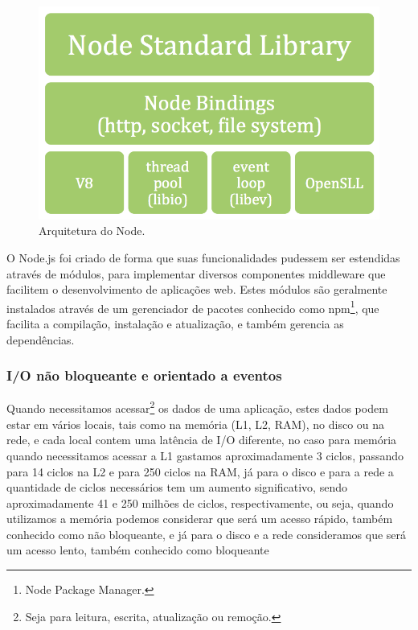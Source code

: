 
    \begin{figure}[hb]
    \centering
    \includegraphics[scale=0.4]{images/node_platform.png}
    \caption{Arquitetura do Node.}
    \label{fig:Arquitetura do Node}
    \end{figure}
  
    
    O Node.js foi criado de forma que suas funcionalidades pudessem ser estendidas através de módulos, para implementar diversos componentes middleware que facilitem o desenvolvimento de aplicações web. Estes módulos são geralmente instalados através de um gerenciador de pacotes conhecido como npm\footnote{Node Package Manager.}, que facilita a compilação, instalação e atualização, e também gerencia as dependências.

\subsubsection{I/O não bloqueante e orientado a eventos}

Quando necessitamos acessar\footnote{Seja para leitura, escrita, atualização ou remoção.} os dados de uma aplicação, estes dados podem estar em vários locais, tais como na memória (L1, L2, RAM), no disco ou na rede, e cada local contem uma latência de I/O diferente, no caso para memória quando necessitamos acessar a L1 gastamos aproximadamente  3 ciclos, passando para 14 ciclos na L2 e para 250 ciclos na RAM, já para o disco e para a rede a quantidade de ciclos necessários tem um aumento significativo, sendo aproximadamente 41 e 250 milhões de ciclos, respectivamente, ou seja, quando utilizamos a memória podemos considerar que será um acesso rápido, também conhecido como não bloqueante, e já para o disco e a rede consideramos que será um acesso lento, também conhecido como bloqueante

